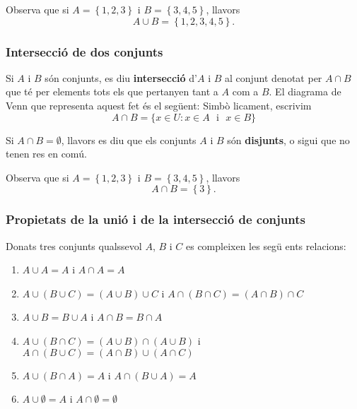 \begin{exem}
Observa que si $A=\left\{ 1,2,3\right\} $ i $B=\left\{ 3,4,5\right\} $,
llavors%
\begin{equation*}
A\cup B=\left\{ 1,2,3,4,5\right\} \text{.}
\end{equation*}
\end{exem}

\subsubsection{Intersecci\'{o} de dos conjunts}

Si $A$ i $B$ s\'{o}n conjunts, es diu \textbf{intersecci\'{o}} d'$A$ i $B$
al conjunt denotat per $A\cap B$ que t\'{e} per elements tots els que
pertanyen tant a $A$ com a $B$. El diagrama de Venn que representa aquest
fet \'{e}s el seg\"{u}ent:  Simb\`{o}%
licament, escrivim%
\begin{equation*}
A\cap B=\{x\in U:x\in A\text{ ~i~ }x\in B\}
\end{equation*}

Si $A\cap B=\emptyset$, llavors es diu que els conjunts $A$ i $B$ s\'{o}n
\textbf{disjunts}, o sigui que no tenen res en com\'{u}.

\begin{exem}
Observa que si $A=\left\{ 1,2,3\right\} $ i $B=\left\{ 3,4,5\right\} $,
llavors%
\begin{equation*}
A\cap B=\left\{ 3\right\} \text{.}
\end{equation*}
\end{exem}

\subsubsection{Propietats de la uni\'{o} i de la intersecci\'{o} de conjunts}

Donats tres conjunts qualssevol $A$, $B$ i $C$ es compleixen les seg\"{u}%
ents relacions:

\begin{enumerate}
\item $A\cup A=A$ i $A\cap A=A$

\item $A\cup(B\cup C)=(A\cup B)\cup C$ i $A\cap(B\cap C)=(A\cap B)\cap C$

\item $A\cup B=B\cup A$ i $A\cap B=B\cap A$

\item $A\cup(B\cap C)=(A\cup B)\cap(A\cup B)$ i $A\cap(B\cup C)=(A\cap
B)\cup(A\cap C)$

\item $A\cup(B\cap A)=A$ i $A\cap(B\cup A)=A$

\item $A\cup\emptyset=A$ i $A\cap\emptyset=\emptyset$
\end{enumerate}

